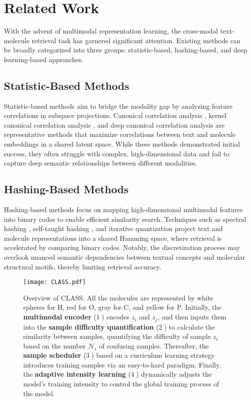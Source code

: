 \section{Related Work}
With the advent of multimodal representation learning, the cross-modal text-molecule retrieval task has garnered significant attention. Existing methods can be broadly categorized into three groups: statistic-based, hashing-based, and deep learning-based approaches.

\subsection{Statistic-Based Methods}
Statistic-based methods aim to bridge the modality gap by analyzing feature correlations in subspace projections. Canonical correlation analysis \cite{hardoon2004canonical}, kernel canonical correlation analysis \cite{lai2000kernel}, and deep canonical correlation analysis \cite{andrew2013deep} are representative methods that maximize correlations between text and molecule embeddings in a shared latent space. While these methods demonstrated initial success, they often struggle with complex, high-dimensional data and fail to capture deep semantic relationships between different modalities.

\subsection{Hashing-Based Methods}
Hashing-based methods focus on mapping high-dimensional multimodal features into binary codes to enable efficient similarity search. Techniques such as spectral hashing \cite{weiss2008spectral}, self-taught hashing \cite{zhang2010self}, and iterative quantization \cite{gong2012iterative} project text and molecule representations into a shared Hamming space, where retrieval is accelerated by comparing binary codes. Notably, the discretization process may overlook nuanced semantic dependencies between textual concepts and molecular structural motifs, thereby limiting retrieval accuracy.

\begin{figure*}[!htbp]
\centering
\texttt{[image: CLASS.pdf]}
\caption{Overview of CLASS. All the molecules are represented by white spheres for H, red for O, gray for C, and yellow for P. Initially, the \textbf{multimodal encoder} (\textcircled{1}) encodes $z_i$ and $z_j$, and then inputs them into the \textbf{sample difficulty quantification} (\textcircled{2}) to calculate the similarity between samples, quantifying the difficulty of sample $z_i$ based on the number $\mathcal{N}_{i}$ of confusing samples. Thereafter, the \textbf{sample scheduler} (\textcircled{3}) based on a curriculum learning strategy introduces training samples via an easy-to-hard paradigm. Finally, the \textbf{adaptive intensity learning} (\textcircled{4}) dynamically adjusts the model's training intensity to control the global training process of the model.}
\vspace{-5pt}
\label{fig:overview}
\end{figure*}


